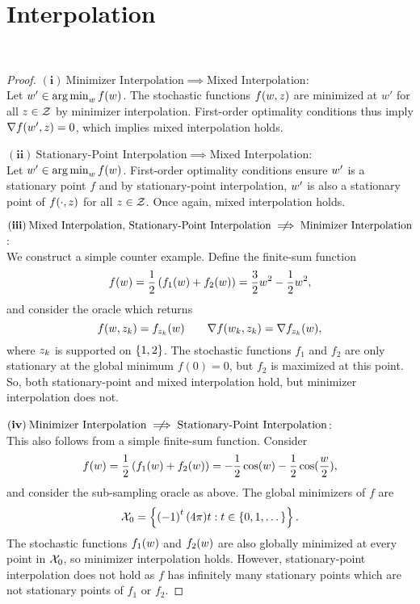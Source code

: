 \section{Interpolation}~\label{app:interpolation}

\interpolationMinima*
\interpolationGradients*
\interpolationMixed*

\hfill \break

\interpRelationships*
\begin{proof}\hfill \break
    \noindent \((\mathbf{i})\: \text{Minimizer Interpolation} \implies \text{Mixed Interpolation} \): \\
    Let \( w' \in \mathop{\rm arg\,min}_w f(w) \).
    The stochastic functions \( f(w, z) \) are minimized at \( w'  \) for all \( z \in \mathcal{Z} \) by minimizer interpolation.
    First-order optimality conditions thus imply \( \nabla f(w', z) = 0 \), which implies mixed interpolation holds. \hfill \break

    \noindent \( (\mathbf{ii}) \: \text{Stationary-Point Interpolation} \implies \text{Mixed Interpolation} \): \\
    Let \( w' \in \mathop{\rm arg\,min}_w f(w) \).
    First-order optimality conditions ensure \( w' \) is a stationary point \( f \) and by stationary-point interpolation, \( w' \) is also a stationary point of \( f(\cdot, z) \) for all \( z \in \mathcal{Z} \).
    Once again, mixed interpolation holds.\hfill \break

\noindent    \(  (\mathbf{iii}) \:\text{Mixed Interpolation, Stationary-Point Interpolation} \centernot \implies \text{Minimizer Interpolation} \): \\
    We construct a simple counter example.
    Define the finite-sum function
    \[ f(w) = \frac 1 2 \left(f_1(w) + f_2(w)\right) = \frac{3}{2}w^2 - \frac 1 2w^2, \]
    and consider the oracle \oracle{} which returns
    \[ f(w, z_{k}) = f_{z_{k}}(w) \quad \quad \nabla f(w_k, z_{k}) = \nabla f_{z_{k}}(w), \] 
    where \( z_{k} \) is supported on \( \left\{1,2\right\} \).
    The stochastic functions \( f_1 \) and \( f_2 \) are only stationary at the global minimum \( f(0) = 0 \), but \( f_2 \) is maximized at this point.
    So, both stationary-point and mixed interpolation hold, but minimizer interpolation does not.\hfill \break

\noindent    \( (\mathbf{iv}) \: \text{Minimizer Interpolation} \centernot \implies \text{Stationary-Point Interpolation} \): \\
    This also follows from a simple finite-sum function.
    Consider
    \[ f(w) = \frac 1 2 \left(f_1(w) + f_2(w)\right) = -\frac 1 2 \cos(w) - \frac 1 2 \cos(\frac{w}{2}), \]
    and consider the sub-sampling oracle \oracle{} as above.
    The global minimizers of \( f \) are 
    \[ \mathcal{X}_0 = \left\{\left(-1\right)^{t} (4\pi) t : t \in \left\{0,1, \dots \right\}\right\}. \]
    The stochastic functions \( f_1(w) \) and \( f_2(w) \) are also globally minimized at every point in \( \mathcal{X}_0 \), so minimizer interpolation holds.
    However, stationary-point interpolation does not hold as \( f \) has infinitely many stationary points which are not stationary points of \( f_1 \) or \( f_2 \). \hfill \break


\end{proof}
